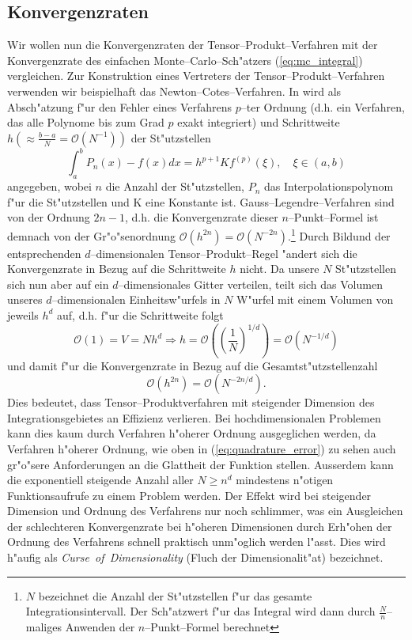 	\subsection{Konvergenzraten}\label{subsec:integrationsproblem_comparison}
	Wir wollen nun die Konvergenzraten der Tensor--Produkt--Verfahren mit der Konvergenzrate des einfachen Monte--Carlo--Sch"atzers (\ref{eq:mc_integral}) vergleichen. Zur Konstruktion eines Vertreters der Tensor--Produkt--Verfahren verwenden wir beispielhaft das Newton--Cotes--Verfahren. In \citep[][3.1.4]{Stoer:2005p10586} wird als Ab\-sch"at\-zung f"ur den Fehler eines Verfahrens $p$--ter Ordnung (d.h. ein Verfahren, das alle Polynome bis zum Grad $p$ exakt integriert) und Schrittweite $h(\approx\frac{b-a}{N}=\mathcal{O}(N^{-1}))$ der St"utzstellen
	\begin{equation}
		\int_a^b P_n(x)-f(x)dx=h^{p+1}K f^{(p)}(\xi),\quad\xi\in(a,b)
		\label{eq:quadrature_error}
	\end{equation}
	angegeben, wobei $n$ die Anzahl der St"utzstellen, $P_n$ das Interpolationspolynom f"ur die St"utzstellen und K eine Konstante ist. Gauss--Legendre--Verfahren sind von der Ordnung $2n-1$, d.h. die Konvergenzrate dieser $n$--Punkt--Formel ist demnach von der Gr"o"senordnung $\mathcal{O}(h^{2n})=\mathcal{O}(N^{-2n})$.\footnote{$N$ bezeichnet die Anzahl der St"utzstellen f"ur das gesamte Integrationsintervall. Der Sch"atzwert f"ur das Integral wird dann durch $\frac{N}{n}$--maliges Anwenden der $n$--Punkt--Formel berechnet}
	Durch Bildund der entsprechenden $d$--dimensionalen Tensor--Produkt--Regel "andert sich die Konvergenzrate in Bezug auf die Schrittweite $h$ nicht. Da unsere $N$ St"utzstellen sich nun aber auf ein $d$--dimensionales Gitter verteilen, teilt sich das Volumen unseres $d$--dimensionalen Einheitsw"urfels in $N$ W"urfel mit einem Volumen von jeweils $h^d$ auf, d.h. f"ur die Schrittweite folgt
	$$\mathcal{O}(1)=V=N h^d \Rightarrow h=\mathcal{O}\left(\left(\frac{1}{N}\right)^{1/d}\right)=\mathcal{O}\left(N^{-1/d}\right)$$	
	und damit f"ur die Konvergenzrate in Bezug auf die Gesamtst"utzstellenzahl
	$$\mathcal{O}(h^{2n})=\mathcal{O}(N^{-2n/d}).$$
	Dies bedeutet, dass Tensor--Produktverfahren mit steigender Dimension des Integrationsgebietes an Effizienz verlieren. Bei hochdimensionalen Problemen kann dies kaum durch Verfahren h"oherer Ordnung ausgeglichen werden, da Verfahren h"oherer Ordnung, wie oben in (\ref{eq:quadrature_error}) zu sehen auch gr"o"sere Anforderungen an die Glattheit der Funktion stellen. Ausserdem kann die exponentiell steigende Anzahl aller $N \geq n^d$ mindestens n"otigen Funktionsaufrufe zu einem Problem werden. Der Effekt wird bei steigender Dimension und Ordnung des Verfahrens nur noch schlimmer, was ein Ausgleichen der schlechteren Konvergenzrate bei h"oheren Dimensionen durch Erh"ohen der Ordnung des Verfahrens schnell praktisch unm"oglich werden l"asst. Dies wird h"aufig als {\em Curse~of~Dimensionality} (Fluch der Dimensionalit"at) bezeichnet.
	

